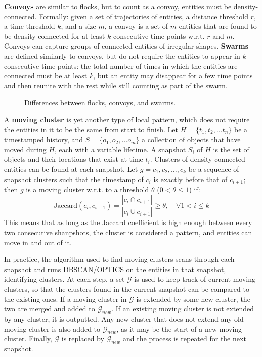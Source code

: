 \textbf{Convoys} are similar to flocks, but to count as a convoy, entities must be density-connected. Formally: given a set of trajectories of entities, a distance threshold $r$, a time threshold $k$, and a size $m$, a convoy is a set of $m$ entities that are found to be density-connected for at least $k$ consecutive time points w.r.t. $r$ and $m$. Convoys can capture groups of connected entities of irregular shapes. \textbf{Swarms} are defined similarly to convoys, but do not require the entities to appear in $k$ consecutive time points: the total number of times in which the entities are connected must be at least $k$, but an entity may disappear for a few time points and then reunite with the rest while still counting as part of the swarm.
\begin{figure}[h]
    \centering
    
    \caption{Differences between flocks, convoys, and swarms.}
\end{figure}


A \textbf{moving cluster} is yet another type of local pattern, which does not require the entities in it to be the same from start to finish. Let $H = \{t_1, t_2, \dots t_n\}$ be a timestamped history, and $S = \{o_1, o_2, \dots o_m\}$ a collection of objects that have moved during $H$, each with a variable lifetime. A snapshot $S_i$ of $H$ is the set of objects and their locations that exist at time $t_i$. Clusters of density-connected entities can be found at each snapshot. Let $g = c_1, c_2, \dots, c_k$ be a sequence of snapshot clusters such that the timestamp of $c_i$ is exactly before that of $c_{i+1}$; then $g$ is a moving cluster w.r.t. to a threshold $\theta$ ($0 < \theta \leq 1$) if:
\begin{equation*}
    \text{Jaccard}(c_i, c_{i+1}) = \frac{|c_i \cap c_{i+1}|}{|c_{i} \cup c_{i+1}|} \geq \theta, \quad \forall 1 < i \leq k
\end{equation*}
This means that as long as the Jaccard coefficient is high enough between every two consecutive shanpshots, the cluster is considered a pattern, and entities can move in and out of it.

In practice, the algorithm used to find moving clusters scans through each snapshot and runs DBSCAN/OPTICS on the entities in that snapshot, identifying clusters. At each step, a set $\mathcal{G}$ is used to keep track of current moving clusters, so that the clusters found in the current snapshot can be compared to the existing ones. If a moving cluster in $\mathcal{G}$ is extended by some new cluster, the two are merged and added to $\mathcal{G}_{new}$. If an existing moving cluster is not extended by any cluster, it is outputted. Any new cluster that does not extend any old moving cluster is also added to $\mathcal{G}_{new}$, as it may be the start of a new moving cluster. Finally, $\mathcal{G}$ is replaced by $\mathcal{G}_{new}$ and the process is repeated for the next snapshot.

